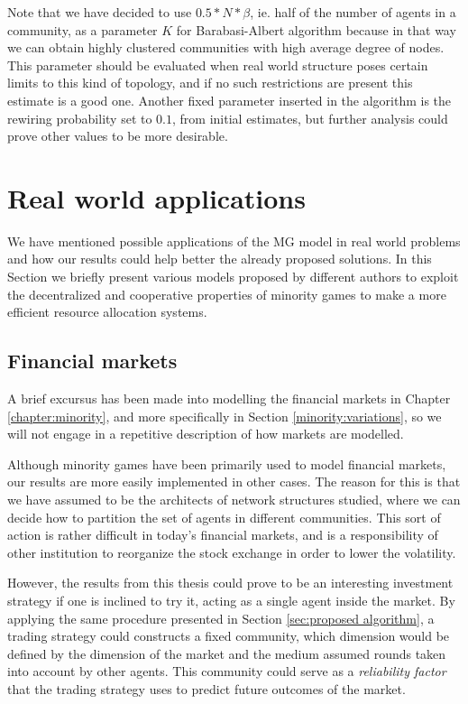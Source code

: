 Note that we have decided to use $0.5 * N * \beta$, ie. half of the number of agents in a community, as a parameter $K$ for Barabasi-Albert algorithm because in that way we can obtain highly clustered communities with high average degree of nodes.
This parameter should be evaluated when real world structure poses certain limits to this kind of topology, and if no such restrictions are present this estimate is a good one.
Another fixed parameter inserted in the algorithm is the rewiring probability set to $0.1$, from initial estimates, but further analysis could prove other values to be more desirable.

\section{Real world applications}
\label{sec:real world}

We have mentioned possible applications of the MG model in real world problems and how our results could help better the already proposed solutions.
In this Section we briefly present various models proposed by different authors to exploit the decentralized and cooperative properties of minority games to make a more efficient resource allocation systems.

\subsection{Financial markets}
\label{subsec:financial markets}

A brief excursus has been made into modelling the financial markets in Chapter \ref{chapter:minority}, and more specifically in Section \ref{minority:variations}, so we will not engage in a repetitive description of how markets are modelled.

Although minority games have been primarily used to model financial markets, our results are more easily implemented in other cases.
The reason for this is that we have assumed to be the architects of network structures studied, where we can decide how to partition the set of agents in different communities.
This sort of action is rather difficult in today's financial markets, and is a responsibility of other institution to reorganize the stock exchange in order to lower the volatility.

However, the results from this thesis could prove to be an interesting investment strategy if one is inclined to try it, acting as a single agent inside the market.
By applying the same procedure presented in Section \ref{sec:proposed algorithm}, a trading strategy could constructs a fixed community, which dimension would be defined by the dimension of the market and the medium assumed rounds taken into account by other agents.
This community could serve as a \textit{reliability factor} that the trading strategy uses to predict future outcomes of the market.

